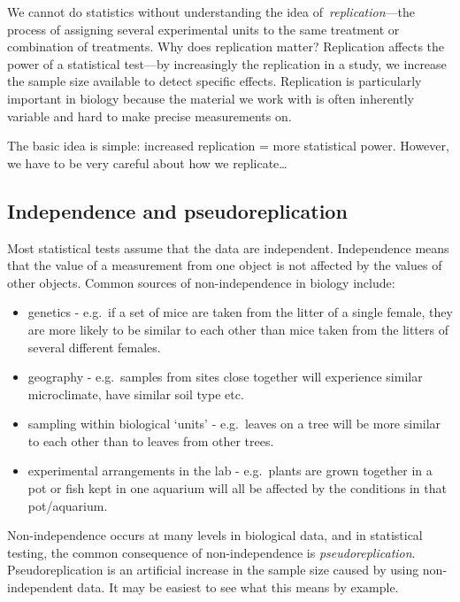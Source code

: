\documentclass[
]{book}
\providecommand{\tightlist}{%
  \setlength{\itemsep}{0pt}\setlength{\parskip}{0pt}}
\begin{document}
We cannot do statistics without understanding the idea of~\emph{replication}---the process of assigning several experimental units to the same treatment or combination of treatments. Why does replication matter? Replication affects the power of a statistical test---by increasingly the replication in a study, we increase the sample size available to detect specific effects. Replication is particularly important in biology because the material we work with is often inherently variable and hard to make precise measurements on.~

The basic idea is simple: increased replication = more statistical power. However, we have to be very careful about how we replicate\ldots{}

\hypertarget{independence}{%
\subsection{Independence and pseudoreplication}\label{independence}}

Most statistical tests assume that the data are independent. Independence means that the value of a measurement from one object is not affected by the values of other objects. Common sources of non-independence in biology include:

\begin{itemize}
\tightlist
\item
  genetics - e.g.~if a set of mice are taken from the litter of a single female, they are more likely to be similar to each other than mice taken from the litters of several different females.
\item
  geography - e.g.~samples from sites close together will experience similar microclimate, have similar soil type etc.
\item
  sampling within biological `units' - e.g.~leaves on a tree will be more similar to each other than to leaves from other trees.
\item
  experimental arrangements in the lab - e.g.~plants are grown together in a pot or fish kept in one aquarium will all be affected by the conditions in that pot/aquarium.
\end{itemize}

Non-independence occurs at many levels in biological data, and in statistical testing, the common consequence of non-independence is \emph{pseudoreplication}. Pseudoreplication is an artificial increase in the sample size caused by using non-independent data. It may be easiest to see what this means by example.
\end{document}
